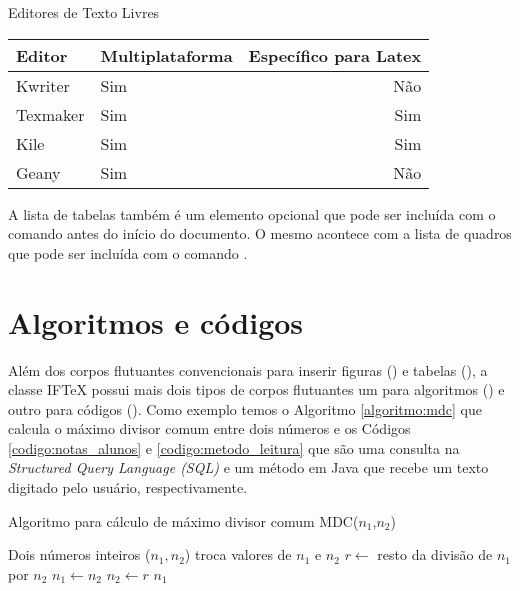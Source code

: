 \begin{quadro}[!htb] \centering
\caption{Editores de Texto Livres} \label{quadro:editores_texto_livres}
\begin{varwidth}{\linewidth}
\begin{tabular}{|l|l|r|}        \hline
Editor     & Multiplataforma & Específico para Latex \\ \hline
Kwriter    & Sim             & Não                   \\
Texmaker   & Sim             & Sim                   \\
Kile       & Sim             & Sim                   \\
Geany      & Sim             & Não                   \\ \hline
\end{tabular}
\end{varwidth}
\end{quadro}

A lista de tabelas também é um elemento opcional que pode ser incluída com o comando  antes do início do documento. O mesmo acontece com a lista de quadros que pode ser incluída com o comando .

\section{Algoritmos e códigos} \label{secao:algoritmos_e_codigos}

Além dos corpos flutuantes convencionais para inserir figuras () e tabelas (), a classe {IF\TeX} possui mais dois tipos de corpos flutuantes um para algoritmos () e outro para códigos (). Como exemplo temos o Algoritmo \ref{algoritmo:mdc} que calcula o máximo divisor comum entre dois números e os Códigos \ref{codigo:notas_alunos} e \ref{codigo:metodo_leitura} que são uma consulta na \textit{Structured Query Language (SQL)} e um método em Java que recebe um texto digitado pelo usuário, respectivamente.

\begin{algoritmo}[!htb]
\caption{Algoritmo para cálculo de máximo divisor comum MDC($n_1$,$n_2$)} \label{algoritmo:mdc}
\begin{algorithmic}[1]
 \Require Dois números inteiros ($n_1, n_2$)
  
   \State troca valores de $n_1$ e $n_2$
 \EndIf
 \Repeat
   \State $r \leftarrow$ resto da divisão de $n_1$ por $n_2$
   \State $n_1 \leftarrow n_2$
   \State $n_2 \leftarrow r$
 \Return $n_1$
\end{algorithmic}
\end{algoritmo}

